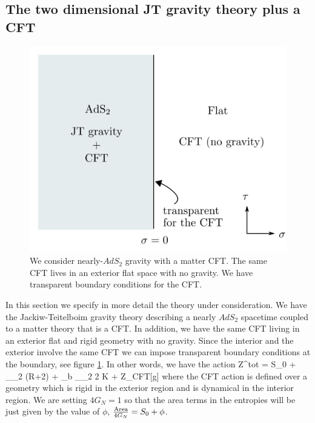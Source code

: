   
 
\subsection{The two dimensional JT gravity theory plus a CFT }


 \begin{figure}[t]
    \begin{center}
    \includegraphics[scale=1]{figures/interface-setup.png}
    \end{center}
    \caption{We consider nearly-$AdS_2$ gravity with a matter CFT. The same CFT lives in an exterior flat space with no gravity. We have transparent boundary conditions for the CFT.  }
    \label{AdSandFlat}
\end{figure}



In this section we specify in more detail the theory under consideration. We have the 
Jackiw-Teitelboim gravity theory describing a nearly $AdS_2$ spacetime coupled to a matter theory that is
a CFT. In addition, we have the same  CFT  living in an  exterior flat and rigid geometry with no gravity. Since the interior and the exterior involve the same   CFT we can impose  transparent boundary conditions at the boundary,
see figure \ref{AdSandFlat}. In other words,  we have the action 
\be {}
 \log Z^{\rm tot} =   { S_0  \pi }   + \int_{\Sigma_2} { \phi {} \pi} (R+2) + { \phi_b  \pi}  \int_{\partial \Sigma_2} 2 K    + \log Z_{CFT}[g]
 \ee
 where the CFT action is defined over a geometry which is rigid in the exterior region and is dynamical in the interior region.   
 We are setting $4G_N=1$ so that the area terms in the entropies will be just given by the value of $\phi$, ${{\rm Area } \over 4 G_N} = S_0 + \phi$. 
 
